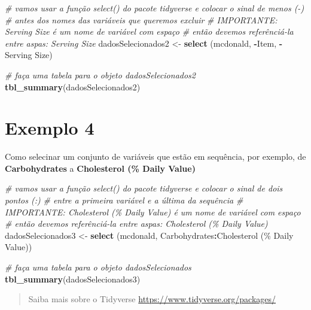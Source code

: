 \documentclass[
]{book}
\newenvironment{Shaded}{\begin{snugshade}}{\end{snugshade}}
\newcommand{\AttributeTok}[1]{\textcolor[rgb]{0.13,0.29,0.53}{#1}}
\newcommand{\CommentTok}[1]{\textcolor[rgb]{0.56,0.35,0.01}{\textit{#1}}}
\newcommand{\FunctionTok}[1]{\textcolor[rgb]{0.13,0.29,0.53}{\textbf{#1}}}
\newcommand{\NormalTok}[1]{#1}
\newcommand{\OtherTok}[1]{\textcolor[rgb]{0.56,0.35,0.01}{#1}}
\newcommand{\SpecialCharTok}[1]{\textcolor[rgb]{0.81,0.36,0.00}{\textbf{#1}}}
\newcommand{\StringTok}[1]{\textcolor[rgb]{0.31,0.60,0.02}{#1}}
\begin{document}
\begin{Shaded}
\begin{Highlighting}[]
\CommentTok{\# vamos usar a função select() do pacote tidyverse e colocar o sinal de menos ({-})}
\CommentTok{\# antes dos nomes das variáveis que queremos excluir}
\CommentTok{\# IMPORTANTE: Serving Size é um nome de variável com espaço }
\CommentTok{\# então devemos referênciá{-}la entre aspas: \textasciigrave{}Serving Size\textasciigrave{}}
\NormalTok{dadosSelecionados2 }\OtherTok{\textless{}{-}} \FunctionTok{select}\NormalTok{ (mcdonald, }\SpecialCharTok{{-}}\NormalTok{Item, }\SpecialCharTok{{-}}\StringTok{\textasciigrave{}}\AttributeTok{Serving Size}\StringTok{\textasciigrave{}}\NormalTok{)}

\CommentTok{\# faça uma tabela para o objeto dadosSelecionados2}
\FunctionTok{tbl\_summary}\NormalTok{(dadosSelecionados2)}
\end{Highlighting}
\end{Shaded}

\section{Exemplo 4}\label{exemplo-4}

Como selecinar um conjunto de variáveis que estão em sequência, por exemplo, de \textbf{Carbohydrates} a \textbf{Cholesterol (\% Daily Value)}

\begin{Shaded}
\begin{Highlighting}[]
\CommentTok{\# vamos usar a função select() do pacote tidyverse e colocar o sinal de dois pontos (:)}
\CommentTok{\# entre a primeira variável e a última da sequência }
\CommentTok{\# IMPORTANTE: Cholesterol (\% Daily Value) é um nome de variável com espaço }
\CommentTok{\# então devemos referênciá{-}la entre aspas: \textasciigrave{}Cholesterol (\% Daily Value)\textasciigrave{}}
\NormalTok{dadosSelecionados3 }\OtherTok{\textless{}{-}} \FunctionTok{select}\NormalTok{ (mcdonald, Carbohydrates}\SpecialCharTok{:}\StringTok{\textasciigrave{}}\AttributeTok{Cholesterol (\% Daily Value)}\StringTok{\textasciigrave{}}\NormalTok{)}

\CommentTok{\# faça uma tabela para o objeto dadosSelecionados}
\FunctionTok{tbl\_summary}\NormalTok{(dadosSelecionados3)}
\end{Highlighting}
\end{Shaded}

\begin{quote}
Saiba mais sobre o Tidyverse \url{https://www.tidyverse.org/packages/}
\end{quote}
\end{document}
